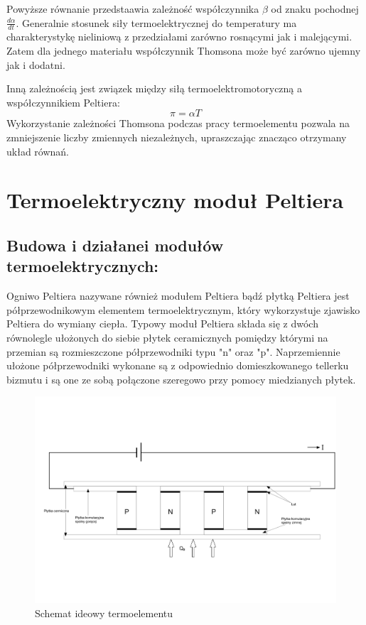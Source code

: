 \documentclass[oneside]{mgr}
\begin{document}
Powyższe równanie przedstaawia zależność współczynnika $\beta$ od znaku pochodnej $\frac{d\alpha}{dt}$. Generalnie stosunek siły termoelektrycznej do temperatury ma charakterystykę nieliniową z przedziałami zarówno rosnącymi jak i malejącymi. Zatem dla jednego materiału współczynnik Thomsona może być zarówno ujemny jak i dodatni.

Inną zależnością jest związek między siłą termoelektromotoryczną a współczynnikiem Peltiera:
\begin{equation}
    \pi = \alpha T
\end{equation}
Wykorzystanie zależności Thomsona podczas pracy termoelementu pozwala na zmniejszenie liczby zmiennych niezależnych, upraszczając znacząco otrzymany układ równań. 

\section{Termoelektryczny moduł Peltiera}
\subsection{Budowa i działanei modułów termoelektrycznych:}
Ogniwo Peltiera nazywane również modułem Peltiera bądź płytką Peltiera jest półprzewodnikowym elementem termoelektrycznym, który wykorzystuje zjawisko Peltiera do wymiany ciepła. Typowy moduł Peltiera składa się z dwóch równolegle ułożonych do siebie płytek ceramicznych pomiędzy którymi na przemian są rozmieszczone półprzewodniki typu "n" oraz "p". Naprzemiennie ułożone półprzewodniki wykonane są z odpowiednio domieszkowanego tellerku bizmutu i są one ze sobą połączone szeregowo przy pomocy miedzianych płytek.

\begin{figure}[h]
    \centering
    \includegraphics[width=\textwidth]{modul_peltiera.jpg}
    \caption{Schemat ideowy termoelementu}
\end{figure}
\end{document}
